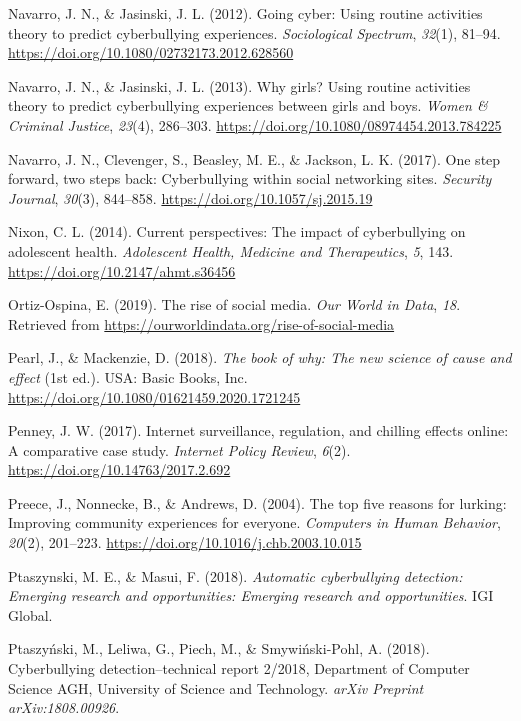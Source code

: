 \documentclass[10pt,dvipsnames]{scrartcl}
\begin{document}
\hypertarget{ref-navarro2012going}{}
Navarro, J. N., \& Jasinski, J. L. (2012). Going cyber: Using routine
activities theory to predict cyberbullying experiences.
\emph{Sociological Spectrum}, \emph{32}(1), 81--94.
\url{https://doi.org/10.1080/02732173.2012.628560}

\hypertarget{ref-navarro2013girls}{}
Navarro, J. N., \& Jasinski, J. L. (2013). Why girls? Using routine
activities theory to predict cyberbullying experiences between girls and
boys. \emph{Women \& Criminal Justice}, \emph{23}(4), 286--303.
\url{https://doi.org/10.1080/08974454.2013.784225}

\hypertarget{ref-navarro2017one}{}
Navarro, J. N., Clevenger, S., Beasley, M. E., \& Jackson, L. K. (2017).
One step forward, two steps back: Cyberbullying within social networking
sites. \emph{Security Journal}, \emph{30}(3), 844--858.
\url{https://doi.org/10.1057/sj.2015.19}

\hypertarget{ref-nixon2014current}{}
Nixon, C. L. (2014). Current perspectives: The impact of cyberbullying
on adolescent health. \emph{Adolescent Health, Medicine and
Therapeutics}, \emph{5}, 143. \url{https://doi.org/10.2147/ahmt.s36456}

\hypertarget{ref-ortiz2019rise}{}
Ortiz-Ospina, E. (2019). The rise of social media. \emph{Our World in
Data}, \emph{18}. Retrieved from
\url{https://ourworldindata.org/rise-of-social-media}

\hypertarget{ref-pearl2018why}{}
Pearl, J., \& Mackenzie, D. (2018). \emph{The book of why: The new
science of cause and effect} (1st ed.). USA: Basic Books, Inc.
\url{https://doi.org/10.1080/01621459.2020.1721245}

\hypertarget{ref-penney2017internet}{}
Penney, J. W. (2017). Internet surveillance, regulation, and chilling
effects online: A comparative case study. \emph{Internet Policy Review},
\emph{6}(2). \url{https://doi.org/10.14763/2017.2.692}

\hypertarget{ref-preece2004top}{}
Preece, J., Nonnecke, B., \& Andrews, D. (2004). The top five reasons
for lurking: Improving community experiences for everyone.
\emph{Computers in Human Behavior}, \emph{20}(2), 201--223.
\url{https://doi.org/10.1016/j.chb.2003.10.015}

\hypertarget{ref-ptaszynski2018automatic}{}
Ptaszynski, M. E., \& Masui, F. (2018). \emph{Automatic cyberbullying
detection: Emerging research and opportunities: Emerging research and
opportunities}. IGI Global.

\hypertarget{ref-ptaszynski2018cyberbullying}{}
Ptaszyński, M., Leliwa, G., Piech, M., \& Smywiński-Pohl, A. (2018).
Cyberbullying detection--technical report 2/2018, Department of Computer
Science AGH, University of Science and Technology. \emph{arXiv Preprint
arXiv:1808.00926}.
\end{document}
